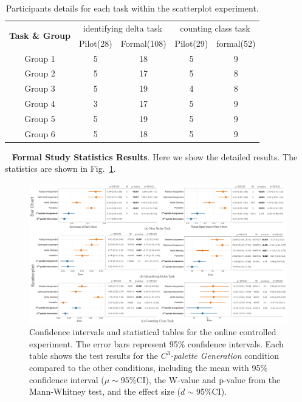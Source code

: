 \documentclass[review,onecolumn]{vgtc}                %
\newcommand{\myparagraph}[1]{\mbox{\ } \newline \noindent \textbf{#1}}
\renewcommand{\paragraph}[1]{\myparagraph{#1}}
\begin{document}
\begin{table}[ht]
\renewcommand\arraystretch{1}
\centering
\caption{Participants details for each task within the scatterplot experiment.}
\label{tab:participantDetail}
\begin{tabular}{|c|c|c|c|c|}
\hline
\multirow{2}{*}{\textbf{Task \& Group}} & \multicolumn{2}{c|}{identifying delta task} & \multicolumn{2}{c|}{counting class task} \\
\cline{2-5}
& Pilot(28) & Formal(108) & Pilot(29) & formal(52) \\
\hline
Group 1 & 5 & 18 & 5  & 9 \\
\hline
Group 2 & 5 & 17 & 5  & 8 \\
\hline
Group 3 & 5 & 19 & 4  & 8 \\
\hline
Group 4 & 3 & 17 & 5  & 9 \\
\hline
Group 5 & 5 & 19 & 5  & 9 \\
\hline
Group 6 & 5 & 18 & 5  & 9 \\
\hline
\end{tabular}
\end{table}

\paragraph{Formal Study Statistics Results}.
Here we show the detailed results. The statistics are shown in Fig.~\ref{fig:formalStudy}.

\begin{figure}[h]
\centering
\includegraphics[width=1\linewidth]{formal-statistics-results.pdf}
\caption{Confidence intervals and statistical tables for the online controlled experiment. The error bars represent 95\% confidence intervals. Each table shows the test results for the  \emph{$C^3$-palette Generation} condition compared to the other conditions, including the mean with 95\% confidence interval ($\mu\sim$95\%CI), the W-value and p-value from the Mann-Whitney test, and the effect size ($d\sim$95\%CI).
}
\vspace*{-5mm}
\label{fig:formalStudy}
\end{figure}
\end{document}
